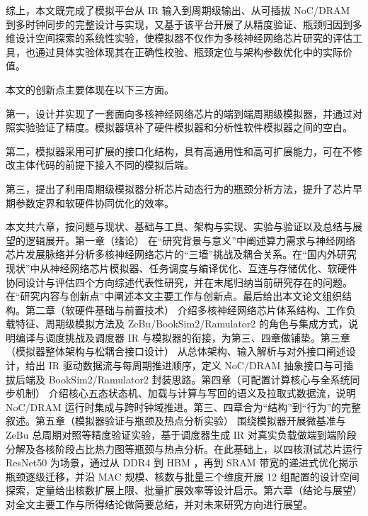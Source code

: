 综上，本文既完成了模拟平台从 IR 输入到周期级输出、从可插拔 NoC/DRAM 到多时钟同步的完整设计与实现，又基于该平台开展了从精度验证、瓶颈归因到多维设计空间探索的系统性实验，使模拟器不仅作为多核神经网络芯片研究的评估工具，也通过具体实验体现其在正确性校验、瓶颈定位与架构参数优化中的实际价值。


本文的创新点主要体现在以下三方面。

第一，设计并实现了一套面向多核神经网络芯片的端到端周期级模拟器，并通过对照实验验证了精度。模拟器填补了硬件模拟器和分析性软件模拟器之间的空白。

第二，模拟器采用可扩展的接口化结构，具有高通用性和高可扩展能力，可在不修改主体代码的前提下接入不同的模拟后端。

第三，提出了利用周期级模拟器分析芯片动态行为的瓶颈分析方法，提升了芯片早期参数定界和软硬件协同优化的效率。


本文共六章，按问题与现状、基础与工具、架构与实现、实验与验证以及总结与展望的逻辑展开。第一章（绪论） 在“研究背景与意义”中阐述算力需求与神经网络芯片发展脉络并分析多核神经网络芯片的“三墙”挑战及耦合关系。在“国内外研究现状”中从神经网络芯片模拟器、任务调度与编译优化、互连与存储优化、软硬件协同设计与评估四个方向综述代表性研究，并在末尾归纳当前研究存在的问题。在“研究内容与创新点”中阐述本文主要工作与创新点。最后给出本文论文组织结构。第二章（软硬件基础与前置技术） 介绍多核神经网络芯片体系结构、工作负载特征、周期级模拟方法及 ZeBu/BookSim2/Ramulator2 的角色与集成方式，说明编译与调度挑战及调度器 IR 与模拟器的衔接，为第三、四章做铺垫。第三章（模拟器整体架构与松耦合接口设计） 从总体架构、输入解析与对外接口阐述设计，给出 IR 驱动数据流与每周期推进顺序，定义 NoC/DRAM 抽象接口与可插拔后端及 BookSim2/Ramulator2 封装思路。第四章（可配置计算核心与全系统同步机制） 介绍核心五态状态机、加载与计算与写回的语义及拉取式数据流，说明 NoC/DRAM 运行时集成与跨时钟域推进。第三、四章合为“结构”到“行为”的完整叙述。第五章（模拟器验证与瓶颈及热点分析实验） 围绕模拟器开展微基准与 ZeBu 总周期对照等精度验证实验，基于调度器生成 IR 对真实负载做端到端阶段分解及各核阶段占比热力图等瓶颈与热点分析。在此基础上，以四核测试芯片运行 ResNet50 为场景，通过从 DDR4 到 HBM ，再到 SRAM 带宽的递进式优化揭示瓶颈逐级迁移，并沿 MAC 规模、核数与批量三个维度开展 12 组配置的设计空间探索，定量给出核数扩展上限、批量扩展效率等设计启示。第六章（结论与展望） 对全文主要工作与所得结论做简要总结，并对未来研究方向进行展望。
